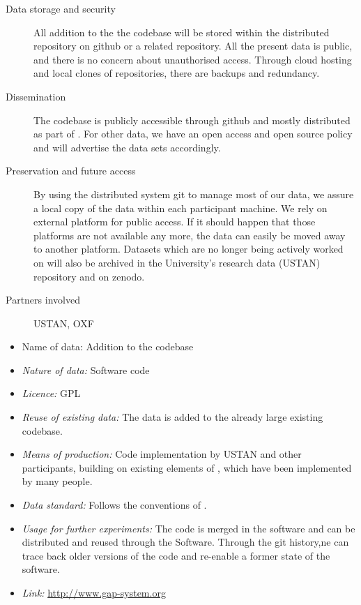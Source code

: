 \documentclass{../../Proposal/LaTeX-proposal/deliverablereport}
\begin{document}
\begin{description}
\item[Data storage and security] All addition to the the \GAP codebase will be stored within the distributed \GAP repository on github or a related repository. All the present data is public, and there is no concern about unauthorised access. Through cloud hosting and local clones of repositories, there are backups and redundancy.\label{GAPsec}
\item[Dissemination] The \GAP codebase is publicly accessible through github and mostly distributed as part of \GAP. For other data, we have an open access and open source policy and will advertise the data sets accordingly.
\label{GAPdiss}

\item[Preservation and future access] By using the distributed system git to manage most of our data, we assure a local copy of the data within each participant machine. We rely on external platform for public access. If it should happen that those platforms are not available any more, the data can easily be moved away to another platform. Datasets which are no longer being actively worked on will also be archived in the University's  research data (USTAN) repository and on zenodo.\label{Sagepres}
\item[Partners involved] USTAN, OXF
\end{description}


\begin{itemize}


\item{Name of data:} Addition to the \GAP codebase
\item\textit{Nature of data:} Software code
\item\textit{Licence:} GPL
\item\textit{Reuse of existing data:} The data is added to the already large existing \GAP codebase.
\item\textit{Means of production:} Code implementation by USTAN and other participants, building on existing elements of \GAP, which have been implemented by many people.
\item\textit{Data standard:} Follows the conventions of \GAP.
\item\textit{Usage for further experiments:} The code is merged in the software and can be distributed and reused through the Software. Through the git history,ne can trace back older versions of the code and re-enable a former state of the software.
\item\textit{Link:} \href{http://www.gap-system.org}{http://www.gap-system.org}
\end{itemize}
\end{document}
